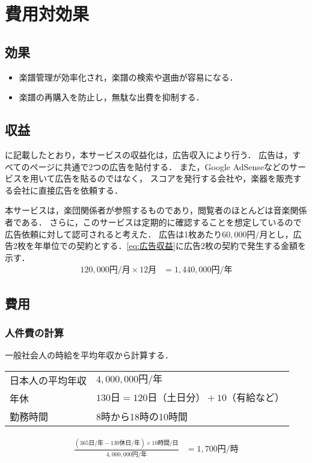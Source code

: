 \chapter{費用対効果}
\section{効果}
\begin{itemize}
    \item 楽譜管理が効率化され，楽譜の検索や選曲が容易になる．
    \item 楽譜の再購入を防止し，無駄な出費を抑制する．
\end{itemize}
\section{収益}
に記載したとおり，本サービスの収益化は，広告収入により行う．
広告は，すべてのページに共通で2つの広告を貼付する．
また，Google AdSenseなどのサービスを用いて広告を貼るのではなく，
スコアを発行する会社や，楽器を販売する会社に直接広告を依頼する．\par
本サービスは，楽団関係者が参照するものであり，閲覧者のほとんどは音楽関係者である．
さらに，このサービスは定期的に確認することを想定しているので広告依頼に対して認可されると考えた．
広告は1枚あたり\(60,000\text{円/月}\)とし，広告2枚を年単位での契約とする．\eqref{eq:広告収益}に広告2枚の契約で発生する金額を示す．
\begin{equation}
    \begin{aligned}
        120,000\text{円/月}\times 12\text{月} & = 1,440,000\text{円/年}\label{eq:広告収益}
    \end{aligned}
\end{equation}
\section{費用}
\subsection{人件費の計算}
一般社会人の時給を平均年収から計算する．
\begin{framed}
    \begin{tabular}{ll}
        日本人の平均年収 & \(4,000,000\text{円/年}\)                          \\
        年休       & \(130\text{日}=120\text{日（土日分）}+10\text{（有給など）}\) \\
        勤務時間     & 8時から18時の10時間
    \end{tabular}
\end{framed}
\begin{equation}
    \begin{aligned}
        \frac{(365\text{日/年}-130\text{休日/年})\times 10\text{時間/日}}{4,000,000\text{円/年}} & = 1,700\text{円/時}\label{eq:時給}
    \end{aligned}
\end{equation}

